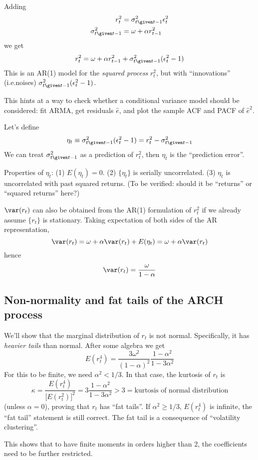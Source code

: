 \documentclass[12pt]{article}
\begin{document}
Adding
\begin{align*}
r_t^2 &= \sigma_{t\given t-1}^2 \epsilon_t^2\\
\sigma_{t\given t-1}^2 &= \omega + \alpha r_{t-1}^2
\end{align*}
we get
\[
r_t^2 = \omega + \alpha r_{t-1}^2
    + \sigma_{t\given t-1}^2 (\epsilon_t^2 - 1)
\]
This is an AR(1) model for the \emph{squared process} $r_t^2$,
but with ``innovations'' (i.e.\@ noises)
$\sigma_{t\given t-1}^2 (\epsilon_t^2 - 1)$.

This hints at a way to check whether a conditional variance model
should be considered:
fit ARMA, get residuals $\hat{e}$, and plot the sample ACF and PACF of
$\hat{e}^2$.

Let's define
\[
\eta_t
\equiv \sigma_{t\given t-1}^2 (\epsilon_t^2 - 1)
= r_t^2 - \sigma_{t\given t-1}^2
\]
We can treat $\sigma_{t\given t-1}^2$ as
a prediction of $r_t^2$,
then $\eta_t$ is the ``prediction error''.

Properties of $\eta_t$:
(1) $E(\eta_t) = 0$.
(2) $\{\eta_t\}$ is serially uncorrelated.
(3) $\eta_t$ is uncorrelated with past squared returns.
(To be verified: should it be ``returns'' or ``squared returns'' here?)

$\var(r_t)$ can also be obtained
from the AR(1) formulation of $r_t^2$
if we already assume $\{r_t\}$ is stationary.
Taking expectation of both sides of the AR representation,
\[
\var(r_t)
= \omega + \alpha \var(r_t) + E(\eta_t)
= \omega + \alpha \var(r_t)
\]
hence
\[
\var(r_t) = \frac{\omega}{1 - \alpha}
\]

\subsection{Non-normality and fat tails of the ARCH process}

We'll show that the marginal distribution of $r_t$ is not normal.
Specifically, it has \emph{heavier tails} than normal.
After some algebra we get
\[
E(r_t^4)
= \frac{3\omega^2}{(1 - \alpha)^2}
  \frac{1 - \alpha^2}{1 - 3\alpha^2}
\]
For this to be finite,
we need $\alpha^2 < 1/3$.
In that case,
the kurtosis of $r_t$ is
\[
\kappa
= \frac{E(r_t^4)}{\bigl[E(r_t^2)\bigr]^2}
= 3\frac{1 - \alpha^2}{1 - 3\alpha^2}
> 3
= \text{kurtosis of normal distribution}
\]
(unless $\alpha = 0$),
proving that $r_t$ has ``fat tails''.
If $\alpha^2 \ge 1/3$,
$E(r_t^4)$ is infinite,
the ``fat tail'' statement is still correct.
The fat tail is a consequence of ``volatility clustering''.

This shows that to have finite moments in orders higher than 2,
the coefficients need to be further restricted.
\end{document}
